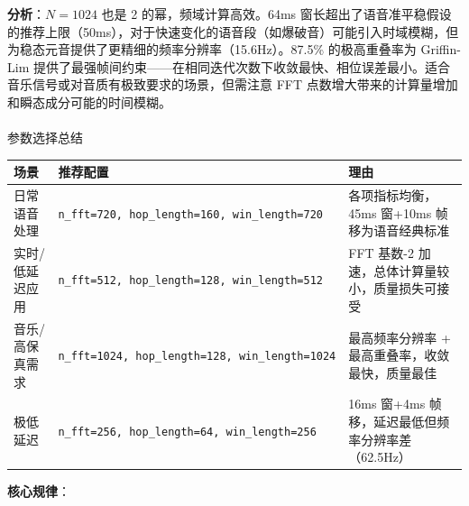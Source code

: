 \documentclass[
  english,
  letterpaper,
  DIV=11,
  numbers=noendperiod]{scrartcl}
\makeatletter
\let\oldparagraph\paragraph
\renewcommand{\paragraph}{
    \@ifstar
      \xxxParagraphStar
      \xxxParagraphNoStar
  }
\newcommand{\xxxParagraphStar}[1]{\oldparagraph*{#1}\mbox{}}
\newcommand{\xxxParagraphNoStar}[1]{\oldparagraph{#1}\mbox{}}
\newcounter{none} %
\makeatother
\begin{document}
\textbf{分析}：\(N=1024\) 也是 2 的幂，频域计算高效。64ms
窗长超出了语音准平稳假设的推荐上限（50ms），对于快速变化的语音段（如爆破音）可能引入时域模糊，但为稳态元音提供了更精细的频率分辨率（15.6Hz）。87.5\%
的极高重叠率为 Griffin-Lim
提供了最强帧间约束------在相同迭代次数下收敛最快、相位误差最小。适合音乐信号或对音质有极致要求的场景，但需注意
FFT 点数增大带来的计算量增加和瞬态成分可能的时间模糊。

\paragraph{参数选择总结}\label{ux53c2ux6570ux9009ux62e9ux603bux7ed3}

{\def\LTcaptype{none} %
\begin{longtable}[]{@{}
  >{\raggedright\arraybackslash}p{}
  >{\raggedright\arraybackslash}p{}
  >{\raggedright\arraybackslash}p{}@{}}
\toprule\noalign{}
\begin{minipage}[b]{\linewidth}\raggedright
场景
\end{minipage} & \begin{minipage}[b]{\linewidth}\raggedright
推荐配置
\end{minipage} & \begin{minipage}[b]{\linewidth}\raggedright
理由
\end{minipage} \\
\midrule\noalign{}
\endhead
\bottomrule\noalign{}
\endlastfoot
日常语音处理 & \texttt{n\_fft=720,\ hop\_length=160,\ win\_length=720} &
各项指标均衡，45ms 窗+10ms 帧移为语音经典标准 \\
实时/低延迟应用 &
\texttt{n\_fft=512,\ hop\_length=128,\ win\_length=512} & FFT 基数-2
加速，总体计算量较小，质量损失可接受 \\
音乐/高保真需求 &
\texttt{n\_fft=1024,\ hop\_length=128,\ win\_length=1024} &
最高频率分辨率 + 最高重叠率，收敛最快，质量最佳 \\
极低延迟 & \texttt{n\_fft=256,\ hop\_length=64,\ win\_length=256} & 16ms
窗+4ms 帧移，延迟最低但频率分辨率差（62.5Hz） \\
\end{longtable}
}

\textbf{核心规律}：
\end{document}
